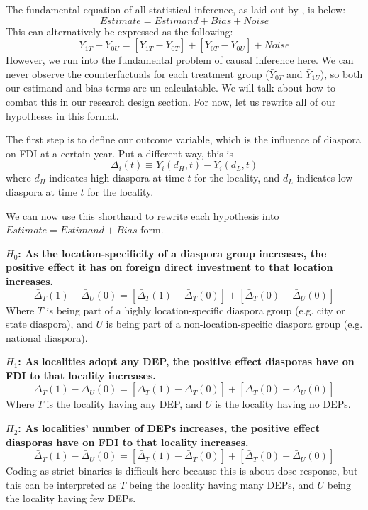 \documentclass[12pt]{article}
\begin{document}
    The fundamental equation of all statistical inference, as laid out by \citet{bueno_de_mesquita_thinking_2021}, is below:
\[Estimate = Estimand + Bias + Noise\]
   This can alternatively be expressed as the following:  \[\bar{Y}_{1T}-\bar{Y}_{0U} = 
    [\bar{Y}_{1T}-\bar{Y}_{0T}] + 
    [\bar{Y}_{0T}-\bar{Y}_{0U}] + Noise
    \]
    However, we run into the fundamental problem of causal inference here. We can never observe the counterfactuals for each treatment group ($\bar{Y}_{0T}$ and $\bar{Y}_{1U}$), so both our estimand and bias terms are un-calculatable. We will talk about how to combat this in our research design section. For now, let us rewrite all of our hypotheses in this format. 
    
    The first step is to define our outcome variable, which is the influence of diaspora on FDI at a certain year. Put a different way, this is \[
\Delta_i(t) \equiv Y_i(d_H,t)-Y_i(d_L,t)
\]
    where $d_H$ indicates high diaspora at time $t$ for the locality, and $d_L$ indicates low diaspora at time $t$ for the locality. 

    We can now use this shorthand to rewrite each hypothesis into $Estimate = Estimand + Bias $ form.
    
\textbf{$H_0$:  As the location-specificity of a diaspora group increases, the positive effect it has on foreign direct investment to that location increases.}
\[
\bar{\Delta}_T(1)-\bar{\Delta}_U(0)
=
\left[\bar{\Delta}_T(1)-\bar{\Delta}_T(0)\right]
+
\left[\bar{\Delta}_T(0)-\bar{\Delta}_U(0)\right]
\]
Where $T$ is being part of a highly location-specific diaspora group (e.g. city or state diaspora), and $U$ is being part of a non-location-specific diaspora group (e.g. national diaspora).

\textbf{$H_1$:  As localities adopt any DEP, the positive effect diasporas have on FDI to that locality increases.}
\[
\bar{\Delta}_T(1)-\bar{\Delta}_U(0)
=
\left[\bar{\Delta}_T(1)-\bar{\Delta}_T(0)\right]
+
\left[\bar{\Delta}_T(0)-\bar{\Delta}_U(0)\right]
\]
Where $T$ is the locality having any DEP, and $U$ is the locality having no DEPs.

\textbf{$H_2$:  As localities' number of DEPs increases, the positive effect diasporas have on FDI to that locality increases.}
\[
\bar{\Delta}_T(1)-\bar{\Delta}_U(0)
=
\left[\bar{\Delta}_T(1)-\bar{\Delta}_T(0)\right]
+
\left[\bar{\Delta}_T(0)-\bar{\Delta}_U(0)\right]
\]
Coding as strict binaries is difficult here because this is about dose response, but this can be interpreted as $T$ being the locality having many DEPs, and $U$ being the locality having few DEPs.
\end{document}
